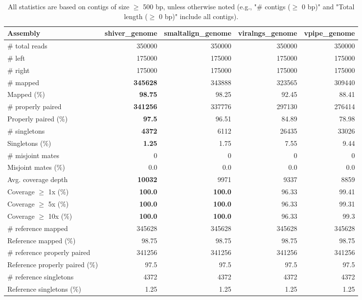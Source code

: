 \documentclass[12pt,a4paper]{article}
\begin{document}
\begin{table}[ht]
\begin{center}
\caption{All statistics are based on contigs of size $\geq$ 500 bp, unless otherwise noted (e.g., "\# contigs ($\geq$ 0 bp)" and "Total length ($\geq$ 0 bp)" include all contigs).}
\begin{tabular}{|l*{4}{|r}|}
\hline
Assembly & shiver\_genome & smaltalign\_genome & viralngs\_genome & vpipe\_genome \\ \hline
\# total reads & 350000 & 350000 & 350000 & 350000 \\ \hline
\# left & 175000 & 175000 & 175000 & 175000 \\ \hline
\# right & 175000 & 175000 & 175000 & 175000 \\ \hline
\# mapped & {\bf 345628} & 343888 & 323565 & 309440 \\ \hline
Mapped (\%) & {\bf 98.75} & 98.25 & 92.45 & 88.41 \\ \hline
\# properly paired & {\bf 341256} & 337776 & 297130 & 276414 \\ \hline
Properly paired (\%) & {\bf 97.5} & 96.51 & 84.89 & 78.98 \\ \hline
\# singletons & {\bf 4372} & 6112 & 26435 & 33026 \\ \hline
Singletons (\%) & {\bf 1.25} & 1.75 & 7.55 & 9.44 \\ \hline
\# misjoint mates & 0 & 0 & 0 & 0 \\ \hline
Misjoint mates (\%) & 0.0 & 0.0 & 0.0 & 0.0 \\ \hline
Avg. coverage depth & {\bf 10032} & 9971 & 9337 & 8859 \\ \hline
Coverage $\geq$ 1x (\%) & {\bf 100.0} & {\bf 100.0} & 96.33 & 99.41 \\ \hline
Coverage $\geq$ 5x (\%) & {\bf 100.0} & {\bf 100.0} & 96.33 & 99.31 \\ \hline
Coverage $\geq$ 10x (\%) & {\bf 100.0} & {\bf 100.0} & 96.33 & 99.3 \\ \hline
\# reference mapped & 345628 & 345628 & 345628 & 345628 \\ \hline
Reference mapped (\%) & 98.75 & 98.75 & 98.75 & 98.75 \\ \hline
\# reference properly paired & 341256 & 341256 & 341256 & 341256 \\ \hline
Reference properly paired (\%) & 97.5 & 97.5 & 97.5 & 97.5 \\ \hline
\# reference singletons & 4372 & 4372 & 4372 & 4372 \\ \hline
Reference singletons (\%) & 1.25 & 1.25 & 1.25 & 1.25 \\ \hline

\end{tabular}
\end{center}
\end{table}
\end{document}
